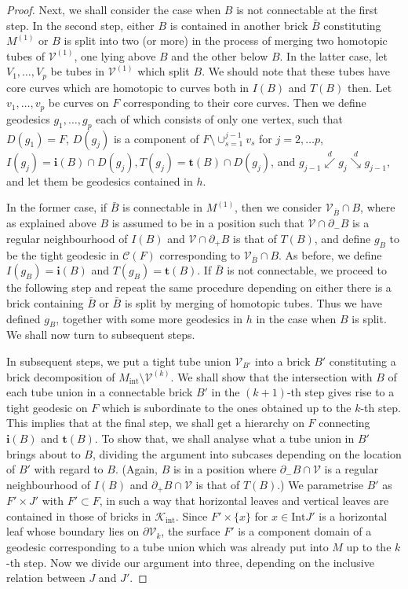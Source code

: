 \documentclass{amsart}
\theoremstyle{definition}
\numberwithin{figure}{section}
\numberwithin{equation}{section}
\newcommand{\blackboard}[1]{\ensuremath{\mathbb{#1}}}
\newcommand{\complexes}{\blackboard{C}}
\newcommand{\subord}{\overset{d}{\searrow}}
\newcommand{\supord}{\overset{d}{\swarrow}}
\def\cc{\complexes}
\def\cc{\mathcal{C}}
\def\ck{\mathcal{K}}
\def\cv{\mathcal{V}}
\def\Int{\mathrm{Int}}
\begin{document}
\begin{proof}
Next, we shall consider the case when $B$ is not connectable at the first step.
In the second step, either $B$ is contained in another brick $\bar B$ constituting $M^{(1)}$ or $B$ is split into two (or more) in the process of merging two homotopic tubes of $\cv^{(1)}$, one lying above $B$ and the other below $B$.
In the latter case, let $V_1, \dots , V_p$ be tubes in $\cv^{(1)}$ which split $B$.
We should note that these tubes have core curves which are homotopic to curves both in $I(B)$ and $T(B)$ then.
Let $v_1, \dots , v_p$ be curves on $F$ corresponding to their core curves.
Then we define geodesics $g_1, \dots, g_p$  each of which consists of only one vertex, such that $D(g_1)=F$, $D(g_j)$ is a component of $F \setminus \cup_{s=1}^{j-1} v_s$ for $j=2, \dots p$, $I(g_j)= \boldsymbol{i}(B) \cap D(g_j), T(g_j)=\boldsymbol{t}(B) \cap D(g_j)$, and $g_{j-1} \supord g_j \subord g_{j-1}$, and let them be geodesics contained in $h$.

In the former case, if $\bar B$ is connectable in $M^{(1)}$, then we consider $\cv_{\bar B} \cap B$, where as explained above $B$ is assumed to be in a position such that $\cv \cap \partial_-B $ is a regular neighbourhood of $I(B)$ and $\cv \cap \partial_+ B$ is that of $T(B)$, and define $g_B$ to be the tight geodesic in $\cc(F)$ corresponding to $\cv_{\bar B} \cap B$.
As before, we define $I(g_B)=\boldsymbol{i}(B)$ and $T(g_B)=\boldsymbol{t}(B)$.
If $\bar B$ is not connectable, we proceed to the following step and repeat the same procedure depending on either there is a brick containing $\bar B$ or $\bar B$ is split by merging of homotopic tubes.
Thus we have defined $g_B$, together with some more geodesics in $h$ in the case when $B$ is split.
We shall now turn to subsequent steps.


In subsequent steps, we put a tight tube union $\cv_{B'}$ into a brick $B'$ constituting a  brick decomposition of $M_\mathrm{int} \setminus \cv^{(k)}$.
We shall show that the intersection with $B$ of  each tube union in a connectable brick $B'$ in the $(k+1)$-th step gives rise to a tight geodesic on $F$ which is subordinate to the ones obtained up to the $k$-th step.
This implies that at the final step, we shall get a hierarchy on $F$ connecting $\boldsymbol{i}(B)$ and $\boldsymbol{t}(B)$.
To show  that, we shall  analyse what a tube union in $B'$ brings about to $B$, dividing the argument into subcases depending on the location of $B'$ with regard to $B$.
(Again, $B$ is in a position where $\partial_- B \cap \cv $ is a regular neighbourhood of $I(B)$ and $\partial_+ B \cap \cv $ is that of $T(B)$.)
We parametrise $B'$ as $F' \times J'$ with $F' \subset F$, in such a way that horizontal leaves and vertical leaves are contained in those of bricks in $\ck_\mathrm{int}$.
Since $F' \times \{x\}$ for $x \in \Int J'$ is a horizontal leaf whose boundary lies on $\partial \cv_k$, the surface $F'$ is a component domain of a geodesic corresponding to a tube union which was already put into $M$ up to the $k$-th step.
Now we divide our argument into three, depending on the inclusive relation between $J$ and $J'$.


\end{proof}
\end{document}

